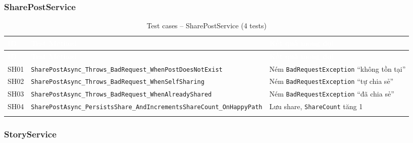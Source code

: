 \documentclass[a4paper]{article}
\begin{document}
\subsubsection{SharePostService}

\begin{longtable}{|C{0.8cm}|L{5.4cm}|L{7.4cm}|}
\hline
{}
\textcolor{white}{\textbf{ID}} &
\textcolor{white}{\textbf{Test Method}} &
\textcolor{white}{\textbf{Kết quả mong đợi}} \\
\hline
\endfirsthead
\hline
{}
\textcolor{white}{\textbf{ID}} &
\textcolor{white}{\textbf{Test Method}} &
\textcolor{white}{\textbf{Kết quả mong đợi}} \\
\hline
\endhead
\hline
\endfoot

SH01 & \texttt{SharePostAsync\_Throws\_BadRequest\_WhenPostDoesNotExist} & Ném \texttt{BadRequestException} ``không tồn tại'' \\
\hline
SH02 & \texttt{SharePostAsync\_Throws\_BadRequest\_WhenSelfSharing} & Ném \texttt{BadRequestException} ``tự chia sẻ'' \\
\hline
{}
SH03 & \texttt{SharePostAsync\_Throws\_BadRequest\_WhenAlreadyShared} & Ném \texttt{BadRequestException} ``đã chia sẻ'' \\
\hline
SH04 & \texttt{SharePostAsync\_PersistsShare\_AndIncrementsShareCount\_OnHappyPath} & Lưu share, \texttt{ShareCount} tăng 1 \\
\hline
\caption{Test cases -- SharePostService (4 tests)}
\end{longtable}

\subsubsection{StoryService}
\end{document}
